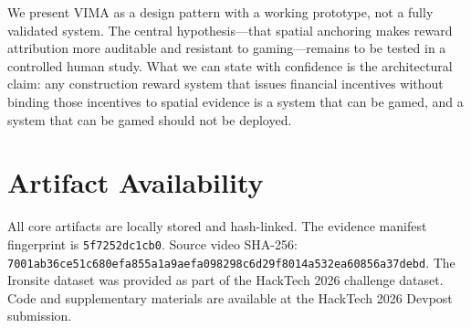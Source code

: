 \documentclass[sigconf,nonacm]{acmart}
\begin{document}
We present VIMA as a design pattern with a working prototype, not a fully validated system.
The central hypothesis---that spatial anchoring makes reward attribution more auditable and resistant to gaming---remains to be tested in a controlled human study.
What we can state with confidence is the architectural claim: any construction reward system that issues financial incentives without binding those incentives to spatial evidence is a system that can be gamed, and a system that can be gamed should not be deployed.

\section*{Artifact Availability}

All core artifacts are locally stored and hash-linked.
The evidence manifest fingerprint is \texttt{5f7252dc1cb0}.
Source video SHA-256: \texttt{7001ab36ce51c680efa855a1a9aefa098298c6d29f8014a532ea60856a37debd}.
The Ironsite dataset was provided as part of the HackTech 2026 challenge dataset.
Code and supplementary materials are available at the HackTech 2026 Devpost submission.
\end{document}
